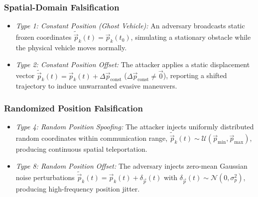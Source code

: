\documentclass[journal]{IEEEtran}
\begin{document}
\subsubsection{Spatial-Domain Falsification}
\begin{itemize}
    \item \textit{Type 1: Constant Position (Ghost Vehicle):} An adversary broadcasts static frozen coordinates $\tilde{\vec{p}}_{k}(t) = \vec{p}_{k}(t_0)$, simulating a stationary obstacle while the physical vehicle moves normally.
    \item \textit{Type 2: Constant Position Offset:} The attacker applies a static displacement vector $\tilde{\vec{p}}_{k}(t) = \vec{p}_{k}(t) + \Delta \vec{p}_{\text{const}}$ ($\Delta \vec{p}_{\text{const}} \ne \vec{0}$), reporting a shifted trajectory to induce unwarranted evasive maneuvers.
\end{itemize}

\subsubsection{Randomized Position Falsification}
\begin{itemize}
    \item \textit{Type 4: Random Position Spoofing:} The attacker injects uniformly distributed random coordinates within communication range, $\tilde{\vec{p}}_{k}(t) \sim \mathcal{U}(\vec{p}_{\min}, \vec{p}_{\max})$, producing continuous spatial teleportation.
    \item \textit{Type 8: Random Position Offset:} The adversary injects zero-mean Gaussian noise perturbations $\tilde{\vec{p}}_{k}(t) = \vec{p}_{k}(t) + \delta_{\vec{p}}(t)$ with $\delta_{\vec{p}}(t) \sim \mathcal{N}(0, \sigma_p^2)$, producing high-frequency position jitter.
\end{itemize}
\end{document}

